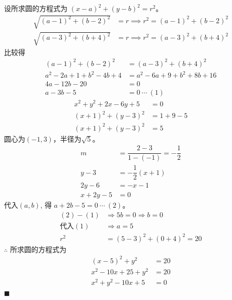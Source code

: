 \documentclass[10pt]{article}
\begin{document}
\begin{enumerate}[leftmargin=*]
        设所求圆的方程式为 $(x - a)^{2} + (y - b)^{2} = r^{2}$。
        \begin{align*}
          \sqrt{(a - 1)^{2} + (b - 2)^{2}} & = r \implies r^{2} = (a - 1)^{2} + (b - 2)^{2} \\
          \sqrt{(a - 3)^{2} + (b + 4)^{2}} & = r \implies r^2 = (a - 3)^{2} + (b + 4)^{2}
        \end{align*}
        比较得
        \begin{align*}
          (a - 1)^{2} + (b - 2)^{2}       & = (a - 3)^{2} + (b + 4)^{2}        \\
          a^{2} - 2a + 1 + b^{2} - 4b + 4 & = a^{2} - 6a + 9 + b^{2} + 8b + 16 \\
          4a - 12b - 20                   & = 0                                \\
          a - 3b - 5                      & = 0 \ \cdots\ (1)
        \end{align*}
        \begin{align*}
          x^{2}+y^{2}+2 x-6 y+5   & = 0         \\
          (x + 1)^{2}+(y - 3)^{2} & = 1 + 9 - 5 \\
          (x + 1)^{2}+(y - 3)^{2} & = 5
        \end{align*}
        圆心为$(-1, 3)$，半径为$\sqrt{5}$。
        \begin{align*}
          m          & = \dfrac{2 - 3}{1 - (-1)} = -\dfrac{1}{2} \\
          y - 3      & = -\dfrac{1}{2}(x + 1)                    \\
          2y - 6     & = -x - 1                                  \\
          x + 2y - 5 & = 0
        \end{align*}
        代入$(a, b)$, 得 $a + 2b - 5 = 0\ \cdots\ (2)$。
        \begin{align*}
          (2) - (1)    & \Rightarrow 5b = 0 \Rightarrow b = 0 \\
          \text{代入}(1) & \Rightarrow a = 5                    \\
          r^2          & = (5 - 3)^2 + (0 + 4)^2 = 20
        \end{align*}
        $\therefore$ 所求圆的方程式为
        \begin{align*}
          (x - 5)^{2} + y^{2}      & = 20 \\
          x^{2} - 10x + 25 + y^{2} & = 20 \\
          x^{2} + y^{2} - 10x + 5  & = 0
        \end{align*} \hfill$\blacksquare$

\end{enumerate}
\end{document}
